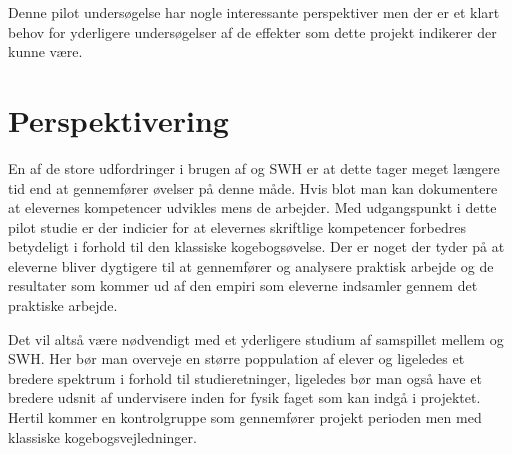 Denne pilot undersøgelse har nogle interessante perspektiver men der er et klart behov for yderligere undersøgelser af de effekter som dette projekt indikerer der kunne være. 


\section{Perspektivering}
\label{sec:per}

En af de store udfordringer i brugen af \ib{} og SWH er at dette tager meget længere tid end at gennemfører øvelser på denne måde. Hvis blot man kan dokumentere at elevernes kompetencer udvikles mens de arbejder. Med udgangspunkt i dette pilot studie er der indicier for at elevernes skriftlige kompetencer forbedres betydeligt i forhold til den klassiske kogebogsøvelse. Der er noget der tyder på at eleverne bliver dygtigere til at gennemfører og analysere praktisk arbejde og de resultater som kommer ud af den empiri som eleverne indsamler gennem det praktiske arbejde.\bigskip


Det vil altså være nødvendigt med et yderligere studium af samspillet mellem \ib{} og SWH. Her bør man overveje en større poppulation af elever og ligeledes et bredere spektrum i forhold til studieretninger, ligeledes bør man også have et bredere udsnit af undervisere inden for fysik faget som kan indgå i projektet. Hertil kommer en kontrolgruppe som gennemfører projekt perioden men med klassiske kogebogsvejledninger.\bigskip



